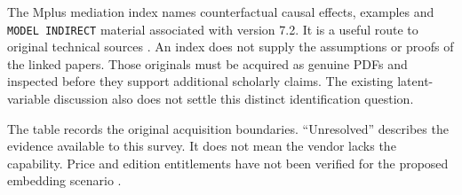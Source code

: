 The Mplus mediation index names counterfactual causal effects, examples and
\texttt{MODEL INDIRECT} material associated with version 7.2. It is a useful
route to original technical sources \citep{exec13_ci_mplus_mediation}. An index
does not supply the assumptions or proofs of the linked papers. Those originals
must be acquired as genuine PDFs and inspected before they support additional
scholarly claims. The existing latent-variable discussion also does not settle
this distinct identification question.

The table records the original acquisition boundaries. ``Unresolved'' describes
the evidence available to this survey. It does not mean the vendor lacks the
capability. Price and edition entitlements have not been verified for the
proposed embedding scenario \citep{exec13_ci_scope}.

